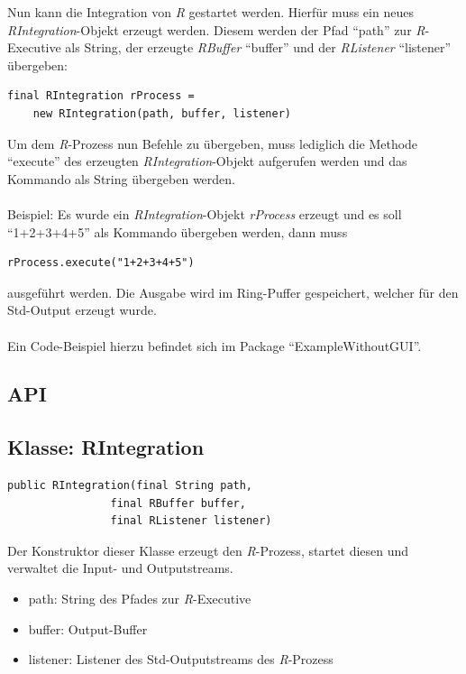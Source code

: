 \documentclass[a4paper, 12pt]{report} %
\begin{document}
Nun kann die Integration von \textit{R} gestartet werden. Hierfür muss ein neues \textit{RIntegration}-Objekt erzeugt werden. Diesem werden der Pfad "`path"' zur \textit{R}-Executive als String, der erzeugte \textit{RBuffer} "`buffer"' und der \textit{RListener} "`listener"' übergeben:

\lstset{language=Java}
\begin{lstlisting}[frame=single]
final RIntegration rProcess = 
	new RIntegration(path, buffer, listener)	
\end{lstlisting}

Um dem \textit{R}-Prozess nun Befehle zu übergeben, muss lediglich die Methode "`execute"' des erzeugten \textit{RIntegration}-Objekt aufgerufen werden und das Kommando als String übergeben werden.\\
\\
Beispiel: Es wurde ein \textit{RIntegration}-Objekt \textit{rProcess} erzeugt und es soll "`1+2+3+4+5"' als Kommando übergeben werden, dann muss

\lstset{language=Java}
\begin{lstlisting}[frame=single]
rProcess.execute("1+2+3+4+5")	
\end{lstlisting}
ausgeführt werden. Die Ausgabe wird im Ring-Puffer gespeichert, welcher für den Std-Output erzeugt wurde.\\
\\
Ein Code-Beispiel hierzu befindet sich im Package "`ExampleWithoutGUI"'.

\subsection{API} \label{API}

\subsection{Klasse: RIntegration}

\lstset{language=Java}
\begin{lstlisting}[frame=single]
public RIntegration(final String path, 
	            final RBuffer buffer,
	            final RListener listener)	
\end{lstlisting}
%
Der Konstruktor dieser Klasse erzeugt den \textit{R}-Prozess, startet diesen und verwaltet die Input- und Outputstreams.
\begin{itemize}
	\item path: String des Pfades zur \textit{R}-Executive
	\item buffer: Output-Buffer
	\item listener: Listener des Std-Outputstreams des \textit{R}-Prozess
\end{itemize}
\end{document}
